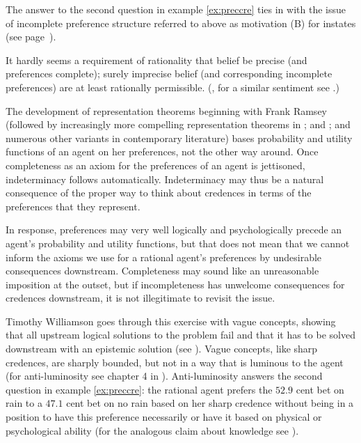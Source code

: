 \documentclass[11pt]{article}
\begin{document}
The answer to the second question in example \ref{ex:preccre} ties in
with the issue of incomplete preference structure referred to above as
motivation (B) for instates (see page~\pageref{page:houwieve}).

\begin{quotex}
  It hardly seems a requirement of rationality that belief be precise
  (and preferences complete); surely imprecise belief (and
  corresponding incomplete preferences) are at least rationally
  permissible. (, for a similar
  sentiment see .)
\end{quotex}

The development of representation theorems beginning with Frank Ramsey
(followed by increasingly more compelling representation theorems in
; and ; and numerous other
variants in contemporary literature) bases probability and utility
functions of an agent on her preferences, not the other way around.
Once completeness as an axiom for the preferences of an agent is
jettisoned, indeterminacy follows automatically. Indeterminacy may
thus be a natural consequence of the proper way to think about
credences in terms of the preferences that they represent.

In response, preferences may very well logically and psychologically
precede an agent's probability and utility functions, but that does
not mean that we cannot inform the axioms we use for a rational
agent's preferences by undesirable consequences downstream.
Completeness may sound like an unreasonable imposition at the outset,
but if incompleteness has unwelcome consequences for credences
downstream, it is not illegitimate to revisit the issue. 

Timothy Williamson goes through this exercise with vague concepts,
showing that all upstream logical solutions to the problem fail and
that it has to be solved downstream with an epistemic solution (see
). Vague concepts, like sharp credences, are
sharply bounded, but not in a way that is luminous to the agent (for
anti-luminosity see chapter 4 in ).
Anti-luminosity answers the second question in example
\ref{ex:preccre}: the rational agent prefers the $52.9$ cent bet on
rain to a $47.1$ cent bet on no rain based on her sharp credence
without being in a position to have this preference necessarily or
have it based on physical or psychological ability (for the analogous
claim about knowledge see ).
\end{document}
